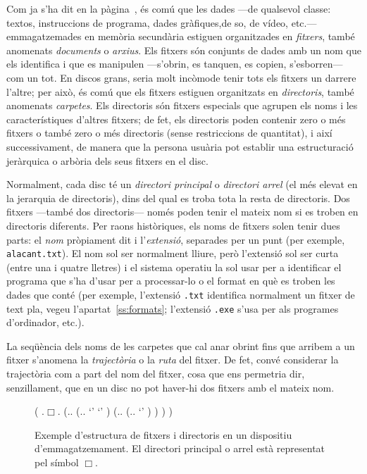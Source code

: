 Com ja s'ha dit en la pàgina~\pageref{pg:menciofitxer}, és comú que
les dades ---de qualsevol classe: textos, instruccions de programa,
dades gràfiques,de so, de vídeo, etc.--- emmagatzemades en memòria
secundària estiguen organitzades en {\em fitxers}, també anomenats
\emph{documents} o \emph{arxius}. Els fitxers són conjunts de dades
amb un nom que els identifica i que es manipulen ---s'obrin, es
tanquen, es copien, s'esborren--- com un tot. En discos grans, seria
molt incòmode tenir tots els fitxers un darrere l'altre; per això, és
comú que els fitxers estiguen organitzats en {\em directoris}, també
anomenats \emph{carpetes}. Els directoris són fitxers especials que
agrupen els noms i les característiques d'altres fitxers; de fet, els
directoris poden contenir zero o més fitxers o també zero o més
directoris (sense restriccions de quantitat), i així successivament,
de manera que la persona usuària pot establir una estructuració
jeràrquica o arbòria dels seus fitxers en el disc.

Normalment, cada disc té un {\em directori principal} o
\emph{directori arrel} (el més elevat en la jerarquia de directoris),
dins del qual es troba tota la resta de directoris. Dos fitxers
---també dos directoris--- només poden tenir el mateix nom si es
troben en directoris diferents. Per raons històriques, els noms de
fitxers solen tenir dues parts: el \emph{nom} pròpiament dit i
l'\emph{extensió}, separades per un punt (per exemple,
\texttt{alacant.txt}). El nom sol ser normalment lliure, però
l'extensió sol ser curta (entre una i quatre lletres) i el sistema
operatiu la sol usar per a identificar el programa que s'ha d'usar per
a processar-lo o el format en què es troben les dades que conté (per
exemple, l'extensió \texttt{.txt} identifica normalment un fitxer de
text pla, vegeu l'apartat~\ref{ss:formats}; l'extensió \texttt{.exe}
s'usa per als programes d'ordinador, etc.).

La seqüència dels noms de les carpetes que cal anar obrint fins que
arribem a un fitxer s'anomena la \emph{trajectòria} o la \emph{ruta}
del fitxer.  De fet, convé considerar la trajectòria com a part del
nom del fitxer, cosa que ens permetria dir, senzillament, que en un
disc no pot haver-hi dos fitxers amb el mateix nom.  

\begin{figure}
  \centering
  \begin{parsetree}
    ( .{$\Box$}.
    (.{}.
    (.{}.
    `'
    `'
    )
    (.{}.
    (.{}.
    `'
    )
    )
    )
    )
  \end{parsetree}
  \caption{Exemple d'estructura de fitxers i directoris en un
    dispositiu d'emmagatzemament. El directori principal o arrel està
    representat pel símbol $\Box$.}\label{fg:fitxersdirs}
\end{figure}

